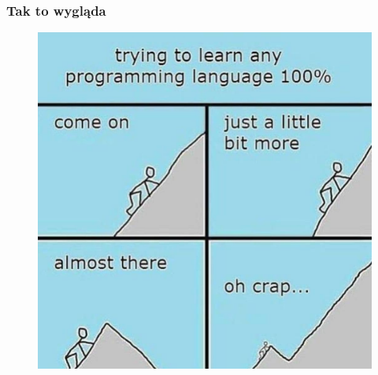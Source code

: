 \documentclass[10pt,t]{beamer}
\begin{document}
\begin{frame}
  \frametitle{Tak to wygląda}

  \vspace{-0.5em}


  \begin{figure}

    \label{fig:Learning-any-language-at-100-procent}

    \centering


    \includegraphics[scale=0.195]
    {./Presentations-pictures/Learning-language-at-100.jpg}

  \end{figure}

\end{frame}
\end{document}
